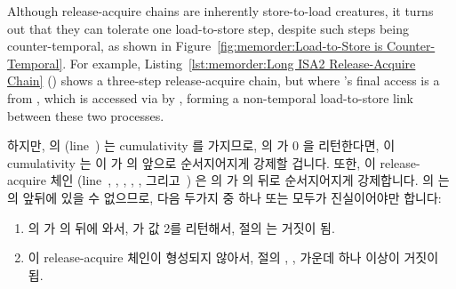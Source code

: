 Although release-acquire chains are inherently store-to-load creatures,
it turns out that they can tolerate one load-to-store step, despite
such steps being counter-temporal, as shown in
Figure~\ref{fig:memorder:Load-to-Store is Counter-Temporal}.
For example,
Listing~\ref{lst:memorder:Long ISA2 Release-Acquire Chain}
()
shows a three-step release-acquire chain, but where 's
final access is a  from , which is
accessed via  by , forming a non-temporal
load-to-store link between these two processes.
\fi
\begin{lineref}
하지만,  의  (line~) 는
cumulativity 를 가지므로,  의  가 0 을 리턴한다면, 이
cumulativity 는 이  가  의 
앞으로 순서지어지게 강제할 겁니다.
또한, 이 release-acquire 체인 (line~, ,
, , , 그리고~) 은
 의  가  의  뒤로
순서지어지게 강제합니다.
 의  는  의  앞뒤에
있을 수 없으므로, 다음 두가지 중 하나 또는 모두가 진실이어야만 합니다:

\end{lineref}
\fi

\begin{enumerate}
\item	{} 의  가  의  뒤에
	와서,  가 값 2를 리턴해서,  절의 
	는 거짓이 됨.
\item	이 release-acquire 체인이 형성되지 않아서,  절의
	, ,  가운데 하나 이상이 거짓이 됩.

\end{enumerate}

